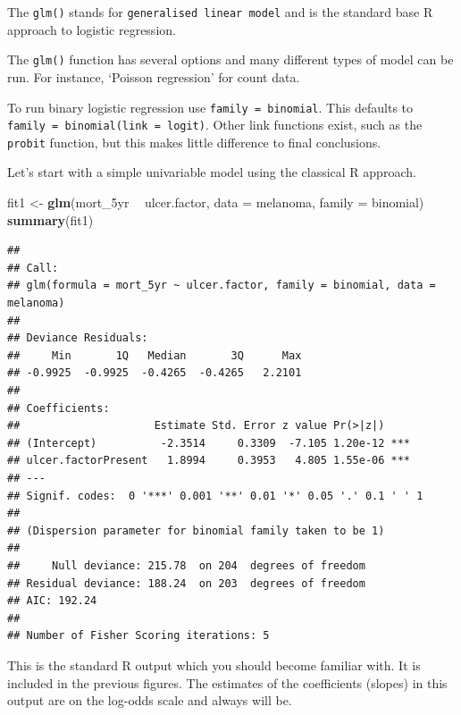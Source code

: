 \documentclass[
  12pt,
  krantz2]{krantz}
\makeatletter
\newenvironment{Shaded}{\begin{snugshade}}{\end{snugshade}}
\newcommand{\DataTypeTok}[1]{\textcolor[rgb]{0.13,0.29,0.53}{#1}}
\newcommand{\KeywordTok}[1]{\textcolor[rgb]{0.13,0.29,0.53}{\textbf{#1}}}
\newcommand{\NormalTok}[1]{#1}
\newcommand{\OperatorTok}[1]{\textcolor[rgb]{0.81,0.36,0.00}{\textbf{#1}}}
\newcommand{\StringTok}[1]{\textcolor[rgb]{0.31,0.60,0.02}{#1}}
\newenvironment{kframe}{%
\medskip{}
\setlength{\fboxsep}{.8em}
 \def\at@end@of@kframe{}%
 \ifinner\ifhmode%
  \def\at@end@of@kframe{\end{minipage}}%
  \begin{minipage}{\columnwidth}%
 \fi\fi%
 \def\FrameCommand##1{\hskip\@totalleftmargin \hskip-\fboxsep
 \colorbox{shadecolor}{##1}\hskip-\fboxsep
     \hskip-\linewidth \hskip-\@totalleftmargin \hskip\columnwidth}%
 \MakeFramed {\advance\hsize-\width
   \@totalleftmargin\z@ \linewidth\hsize
   \@setminipage}}%
 {\par\unskip\endMakeFramed%
 \at@end@of@kframe}
\renewenvironment{Shaded}{\begin{kframe}}{\end{kframe}}
\makeatother
\begin{document}

The \texttt{glm()} stands for \texttt{generalised\ linear\ model} and is the standard base R approach to logistic regression.

The \texttt{glm()} function has several options and many different types of model can be run.
For instance, `Poisson regression' for count data.

To run binary logistic regression use \texttt{family\ =\ binomial}.
This defaults to \texttt{family\ =\ binomial(link\ =\ \textquotesingle{}logit\textquotesingle{})}.
Other link functions exist, such as the \texttt{probit} function, but this makes little difference to final conclusions.

Let's start with a simple univariable model using the classical R approach.

\begin{Shaded}
\begin{Highlighting}[]
\NormalTok{fit1 <-}\StringTok{ }\KeywordTok{glm}\NormalTok{(mort_5yr }\OperatorTok{~}\StringTok{ }\NormalTok{ulcer.factor, }\DataTypeTok{data =}\NormalTok{ melanoma, }\DataTypeTok{family =}\NormalTok{ binomial)}
\KeywordTok{summary}\NormalTok{(fit1)}
\end{Highlighting}
\end{Shaded}

\begin{verbatim}
## 
## Call:
## glm(formula = mort_5yr ~ ulcer.factor, family = binomial, data = melanoma)
## 
## Deviance Residuals: 
##     Min       1Q   Median       3Q      Max  
## -0.9925  -0.9925  -0.4265  -0.4265   2.2101  
## 
## Coefficients:
##                     Estimate Std. Error z value Pr(>|z|)    
## (Intercept)          -2.3514     0.3309  -7.105 1.20e-12 ***
## ulcer.factorPresent   1.8994     0.3953   4.805 1.55e-06 ***
## ---
## Signif. codes:  0 '***' 0.001 '**' 0.01 '*' 0.05 '.' 0.1 ' ' 1
## 
## (Dispersion parameter for binomial family taken to be 1)
## 
##     Null deviance: 215.78  on 204  degrees of freedom
## Residual deviance: 188.24  on 203  degrees of freedom
## AIC: 192.24
## 
## Number of Fisher Scoring iterations: 5
\end{verbatim}


This is the standard R output which you should become familiar with.
It is included in the previous figures.
The estimates of the coefficients (slopes) in this output are on the log-odds scale and always will be.
\end{document}
